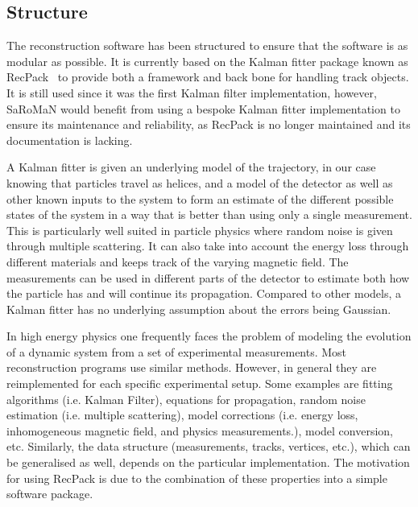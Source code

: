 \subsection{Structure}
The reconstruction software has been structured to ensure that the software is as modular as possible. It is currently based on the Kalman fitter package known as RecPack~\cite{RecPack} to provide both a framework and back bone for handling track objects. It is still used since it was the first Kalman filter implementation, however, SaRoMaN would benefit from using a bespoke Kalman fitter implementation to ensure its maintenance and reliability, as RecPack is no longer maintained and its documentation is lacking. 

A Kalman fitter is given an underlying model of the trajectory, in our case knowing that particles travel as helices, and a model of the detector as well as other known inputs to the system to form an estimate of the different possible states of the system in a way that is better than using only a single measurement. This is particularly well suited in particle physics where random noise is given through multiple scattering. It can also take into account the energy loss through different materials and keeps track of the varying magnetic field. The measurements can be used in different parts of the detector to estimate both how the particle has and will continue its propagation. Compared to other models, a Kalman fitter has no underlying assumption about the errors being Gaussian.

In high energy physics one frequently faces the problem of modeling the evolution of a dynamic system from a set of experimental measurements. Most reconstruction programs use similar methods. However, in general they are reimplemented for each specific experimental setup. Some examples are fitting algorithms (i.e. Kalman Filter), equations for propagation, random noise estimation (i.e. multiple scattering), model corrections (i.e. energy loss, inhomogeneous magnetic field, and physics measurements.), model conversion, etc. Similarly, the data structure (measurements, tracks, vertices, etc.), which can be generalised as well, depends on the particular implementation. The motivation for using RecPack is due to the combination of these properties into a simple software package.

